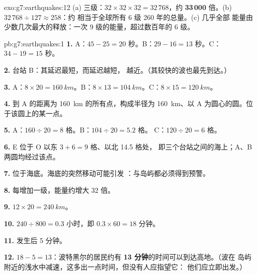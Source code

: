 \begin{solution}{exo:g7:earthquakes:12}
(a) 三级：$32 \times 32 \times 32 = 32\,768$，约
\textbf{33\,000} 倍。(b) $32\,768 \div 127 \approx 258$：约
相当于全球所有 6 级 260 年的总量。(c) 几乎全部
能量由少数几次最大的释放：一次
9 级的能量，超过数百年的 6 级。
\end{solution}

\begin{solution}{pb:g7:earthquakes:1}
\textbf{1.} A：$45 - 25 = 20$ 秒。B：$29 - 16 = 13$ 秒。C：$34 - 19 =
15$ 秒。

\textbf{2.} 台站 B：其延迟最短，而延迟越短，
越近。（其较快的波也最先到达。）

\textbf{3.} A：$8 \times 20 = \qty{160}{km}$。B：$8 \times 13 =
\qty{104}{km}$。C：$8 \times 15 = \qty{120}{km}$。

\textbf{4.} 到 A 的距离为 \qty{160}{km} 的所有点，构成半径为
\qty{160}{km}、以 A 为圆心的圆。位于该圆上的某一点。

\textbf{5.} A：$160 \div 20 = 8$ 格。B：$104 \div 20 = 5.2$ 格。
C：$120 \div 20 = 6$ 格。

\textbf{6.} E 位于 O 以东 $3 + 6 = 9$ 格、以北 14.5 格处，
即三个台站之间的海上；A、B 两圆均经过该点。

\textbf{7.} 位于海底。海底的突然移动可能引发
：与岛屿都必须得到预警。

\textbf{8.} 每增加一级，能量约增大 32 倍。

\textbf{9.} $12 \times 20 = \qty{240}{km}$。

\textbf{10.} $240 \div 800 = 0.3$ 小时，即 $0.3 \times 60 = 18$ 分钟。

\textbf{11.} 发生后 5 分钟。

\textbf{12.} $18 - 5 = 13$：波特黑尔的居民约有
\textbf{13 分钟}的时间可以到达高地。（波在
岛屿附近的浅水中减速，这多出一点时间，但没有人应指望它：
他们应立即出发。）
\end{solution}
